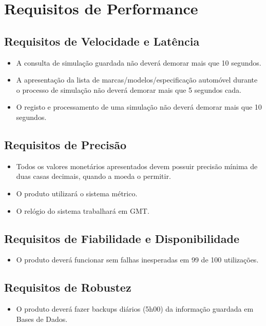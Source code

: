 \section{Requisitos de Performance}
\subsection{Requisitos de Velocidade e Latência}
\begin{itemize}
\item A consulta de simulação guardada não deverá demorar mais que 10 segundos.

\item A apresentação da lista de marcas/modelos/especificação automóvel durante o processo de simulação não deverá demorar mais que 5 segundos cada.

\item O registo e processamento de uma simulação não deverá demorar mais que 10 segundos.
\end{itemize}


\subsection{Requisitos de Precisão}
\begin{itemize}
\item Todos os valores monetários apresentados devem possuir precisão mínima de duas casas decimais, quando a moeda o permitir.

\item O produto utilizará o sistema métrico.

\item O relógio do sistema trabalhará em GMT.
\end{itemize}


\subsection{Requisitos de Fiabilidade e Disponibilidade}
\begin{itemize}
\item O produto deverá funcionar sem falhas inesperadas em 99 de 100 utilizações.
\end{itemize}

\subsection{Requisitos de Robustez}
\begin{itemize}
\item O produto deverá fazer backups diários (5h00) da informação guardada em Bases de Dados.
\end{itemize}


